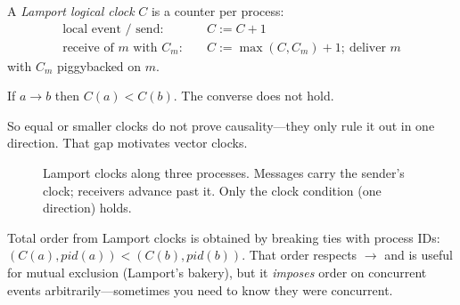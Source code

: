 A \emph{Lamport logical clock} $C$ is a counter per process:
\begin{equation}
\begin{aligned}
\text{local event / send:}&\quad C := C+1 \\
\text{receive of }m\text{ with }C_m:&\quad C := \max(C, C_m)+1;\ \text{deliver }m
\end{aligned}
\end{equation}
with $C_m$ piggybacked on $m$.

\begin{theorem}
If $a\to b$ then $C(a) < C(b)$. The converse does not hold.
\end{theorem}
So equal or smaller clocks do not prove causality---they only rule it out in one direction. That gap motivates vector clocks.

\begin{figure}[h]
\centering
{}
\caption{Lamport clocks along three processes. Messages carry the sender's clock; receivers advance past it. Only the clock condition (one direction) holds.}
\label{fig:lamport}
\end{figure}

Total order from Lamport clocks is obtained by breaking ties with process IDs: $(C(a), pid(a)) < (C(b), pid(b))$. That order respects $\to$ and is useful for mutual exclusion (Lamport's bakery), but it \emph{imposes} order on concurrent events arbitrarily---sometimes you need to know they were concurrent.

